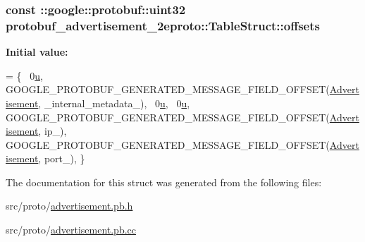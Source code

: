 \subsubsection[{\texorpdfstring{offsets}{offsets}}]{\setlength{\rightskip}{0pt plus 5cm}const \+::google\+::protobuf\+::uint32 protobuf\+\_\+advertisement\+\_\+2eproto\+::\+Table\+Struct\+::offsets\hspace{0.3cm}{\ttfamily [static]}}\hypertarget{structprotobuf__advertisement__2eproto_1_1_table_struct_a4126f35a0f4e23e0f9ffee93f1f3a67f}{}\label{structprotobuf__advertisement__2eproto_1_1_table_struct_a4126f35a0f4e23e0f9ffee93f1f3a67f}
{\bfseries Initial value\+:}
\begin{DoxyCode}
= \{
  ~0\hyperlink{pem_8h_aae315ef0aa014d60426f50686217d264}{u},  
  GOOGLE\_PROTOBUF\_GENERATED\_MESSAGE\_FIELD\_OFFSET(\hyperlink{class_advertisement}{Advertisement}, \_internal\_metadata\_),
  ~0\hyperlink{pem_8h_aae315ef0aa014d60426f50686217d264}{u},  
  ~0\hyperlink{pem_8h_aae315ef0aa014d60426f50686217d264}{u},  
  GOOGLE\_PROTOBUF\_GENERATED\_MESSAGE\_FIELD\_OFFSET(\hyperlink{class_advertisement}{Advertisement}, ip\_),
  GOOGLE\_PROTOBUF\_GENERATED\_MESSAGE\_FIELD\_OFFSET(\hyperlink{class_advertisement}{Advertisement}, port\_),
\}
\end{DoxyCode}


The documentation for this struct was generated from the following files\+:\begin{DoxyCompactItemize}
\item 
src/proto/\hyperlink{advertisement_8pb_8h}{advertisement.\+pb.\+h}\item 
src/proto/\hyperlink{advertisement_8pb_8cc}{advertisement.\+pb.\+cc}\end{DoxyCompactItemize}
